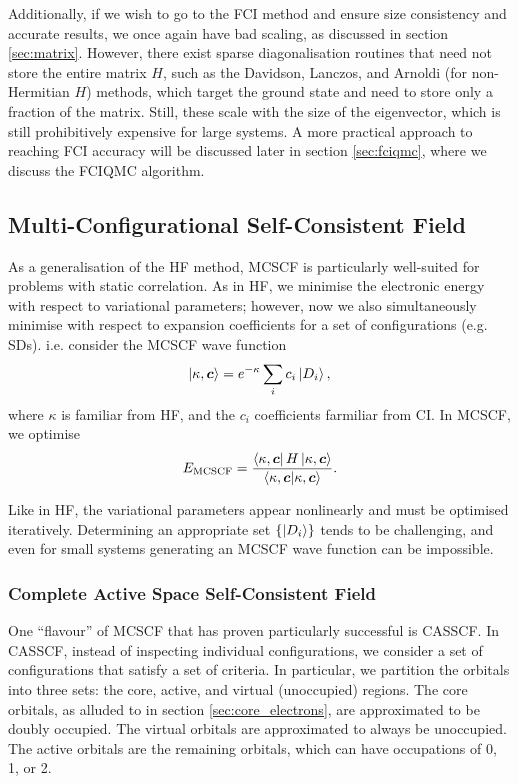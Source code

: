 Additionally, if we wish to go to the \gls{FCI} method and ensure size consistency and accurate results, we once again have bad scaling, as discussed in section \ref{sec:matrix}. However, there exist sparse diagonalisation routines that need not store the entire matrix $H$, such as the Davidson,\cite{davidsonIterative1975} Lanczos,\cite{lanczosIteration1950} and Arnoldi\cite{arnoldiPrinciple1951} (for non-Hermitian $H$) methods, which target the ground state and need to store only a fraction of the matrix. Still, these scale with the size of the eigenvector, which is still prohibitively expensive for large systems. A more practical approach to reaching \gls{FCI} accuracy will be discussed later in section \ref{sec:fciqmc}, where we discuss the \gls{FCIQMC} algorithm.

\subsection{Multi-Configurational Self-Consistent Field}

As a generalisation of the \gls{HF} method, \gls{MCSCF} is particularly well-suited for problems with static correlation.\cite{helgakerMolecular2014,eadeDirect1981,roosNew1972} As in \gls{HF}, we minimise the electronic energy with respect to variational parameters; however, now we also simultaneously minimise with respect to expansion coefficients for a set of configurations (e.g. \glspl{SD}). i.e. consider the MCSCF wave function
\begin{equation}
\ket{\kappa,\bm c} = e^{-\kappa}\sum_ic_i\ket{D_i},
\end{equation}
where $\kappa$ is familiar from HF, and the $c_i$ coefficients farmiliar from \gls{CI}. In MCSCF, we optimise
\begin{equation}
E_\mathrm{MCSCF} = \frac{\bra{\kappa,\bm c}H\ket{\kappa,\bm c}}{\bra{\kappa,\bm c}\ket{\kappa,\bm c}}.
\end{equation}

Like in HF, the variational parameters appear nonlinearly and must be optimised iteratively. Determining an appropriate set $\{\ket{D_i}\}$ tends to be challenging, and even for small systems generating an MCSCF wave function can be impossible.

\subsubsection{Complete Active Space Self-Consistent Field}
One ``flavour'' of \gls{MCSCF} that has proven particularly successful is \gls{CASSCF}.\cite{olsenCASSCF2011,roosComplete1980,siegbahnComparison1980,siegbahnComplete1981} In CASSCF, instead of inspecting individual configurations, we consider a set of configurations that satisfy a set of criteria. In particular, we partition the orbitals into three sets: the core, active, and virtual (unoccupied) regions. The core orbitals, as alluded to in section \ref{sec:core_electrons}, are approximated to be doubly occupied. The virtual orbitals are approximated to always be unoccupied. The active orbitals are the remaining orbitals, which can have occupations of 0, 1, or 2.

